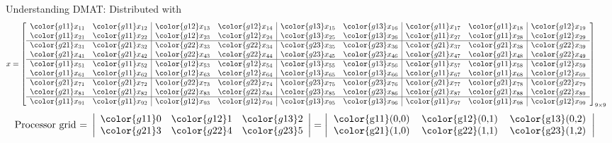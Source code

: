 \begin{frame}[shrink]
\begin{exampleblock}{Understanding DMAT: Distributed with }
\begin{align*}
x &= \left[
      \begin{array}{ll|ll|ll|ll|l}
      \color{g11}x_{11} & \color{g11}x_{12} & \color{g12}x_{13} & \color{g12}x_{14} & \color{g13}x_{15} & \color{g13}x_{16} & \color{g11}x_{17} & \color{g11}x_{18} & \color{g12}x_{19}\\
      \color{g11}x_{21} & \color{g11}x_{22} & \color{g12}x_{23} & \color{g12}x_{24} & \color{g13}x_{25} & \color{g13}x_{26} & \color{g11}x_{27} & \color{g11}x_{28} & \color{g12}x_{29}\\\hline
      \color{g21}x_{31} & \color{g21}x_{32} & \color{g22}x_{33} & \color{g22}x_{34} & \color{g23}x_{35} & \color{g23}x_{36} & \color{g21}x_{37} & \color{g21}x_{38} & \color{g22}x_{39}\\
      \color{g21}x_{41} & \color{g21}x_{42} & \color{g22}x_{43} & \color{g22}x_{44} & \color{g23}x_{45} & \color{g23}x_{46} & \color{g21}x_{47} & \color{g21}x_{48} & \color{g22}x_{49}\\\hline
      \color{g11}x_{51} & \color{g11}x_{52} & \color{g12}x_{53} & \color{g12}x_{54} & \color{g13}x_{55} & \color{g13}x_{56} & \color{g11}x_{57} & \color{g11}x_{58} & \color{g12}x_{59}\\
      \color{g11}x_{61} & \color{g11}x_{62} & \color{g12}x_{63} & \color{g12}x_{64} & \color{g13}x_{65} & \color{g13}x_{66} & \color{g11}x_{67} & \color{g11}x_{68} & \color{g12}x_{69}\\\hline
      \color{g21}x_{71} & \color{g21}x_{72} & \color{g22}x_{73} & \color{g22}x_{74} & \color{g23}x_{75} & \color{g23}x_{76} & \color{g21}x_{77} & \color{g21}x_{78} & \color{g22}x_{79}\\
      \color{g21}x_{81} & \color{g21}x_{82} & \color{g22}x_{83} & \color{g22}x_{84} & \color{g23}x_{85} & \color{g23}x_{86} & \color{g21}x_{87} & \color{g21}x_{88} & \color{g22}x_{89}\\\hline
      \color{g11}x_{91} & \color{g11}x_{92} & \color{g12}x_{93} & \color{g12}x_{94} & \color{g13}x_{95} & \color{g13}x_{96} & \color{g11}x_{97} & \color{g11}x_{98} & \color{g12}x_{99}\\
      \end{array}
\right]_{9\times 9}
\end{align*}
\begin{align*}
\text{Processor grid = }\left|
      \begin{array}{lll}
      \color{g11}0 & \color{g12}1 & \color{g13}2\\
      \color{g21}3 & \color{g22}4 & \color{g23}5
      \end{array}
\right| &= 
\left|
      \begin{tabular}{lll}
      \color{g11}(0,0) & \color{g12}(0,1) & \color{g13}(0,2)\\
      \color{g21}(1,0) & \color{g22}(1,1) & \color{g23}(1,2)
      \end{tabular}
\right|
\end{align*}
\end{exampleblock}
\end{frame}


